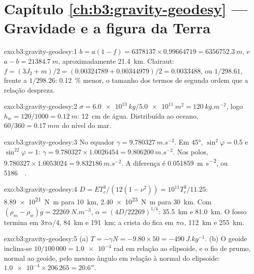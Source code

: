 \section*{Capítulo \ref{ch:b3:gravity-geodesy} --- Gravidade e a figura da Terra}

\begin{solution}{exo:b3:gravity-geodesy:1}
$b = a(1 - f) = 6378137\times0.99664719 = \qty{6356752.3}{m}$, e
$a - b = \qty{21384.7}{m}$, aproximadamente \qty{21.4}{km}. Clairaut:
$f = (3J_2 + m)/2 = (0.00324789 + 0.00344979)/2 = \num{0.0033488}$, ou
$1/298.61$, frente a $1/298.26$: \qty{0.12}{\percent} menor, o tamanho dos
termos de segunda ordem que a relação despreza.
\end{solution}

\begin{solution}{exo:b3:gravity-geodesy:2}
$\sigma = \qty{6.0e13}{kg}/\qty{5.0e11}{m^2} = \qty{120}{kg.m^{-2}}$, logo
$h_w = 120/1000 = \qty{0.12}{m}$: \qty{12}{cm} de água. Distribuída ao
oceano, $60/360 = \qty{0.17}{mm}$ do nível do mar.
\end{solution}

\begin{solution}{exo:b3:gravity-geodesy:3}
No equador $\gamma = \qty{9.780327}{m.s^{-2}}$. Em \ang{45},
$\sin^2\varphi = 0.5$ e $\sin^22\varphi = 1$: $\gamma = 9.780327\times1.0026454
= \qty{9.806200}{m.s^{-2}}$. Nos polos, $9.780327\times1.0053024 =
\qty{9.832186}{m.s^{-2}}$. A diferença é \qty{0.051859}{m.s^{-2}}, ou
\qty{5186}{\milli\gal}.
\end{solution}

\begin{solution}{exo:b3:gravity-geodesy:4}
$D = ET_e^3/(12(1 - \nu^2)) = 10^{11}T_e^3/11.25$: \qty{8.89e21}{N.m} para
\qty{10}{km}, \qty{2.40e23}{N.m} para \qty{30}{km}. Com $(\rho_m - \rho_w)g =
\qty{22269}{N.m^{-3}}$, $\alpha = (4D/22269)^{1/4}$: \qty{35.5}{km} e
\qty{81.0}{km}. O fosso termina em $3\pi\alpha/4$, \qty{84}{km} e \qty{191}{km};
a crista do  fica em $\pi\alpha$, \qty{112}{km} e \qty{255}{km}.
\end{solution}

\begin{solution}{exo:b3:gravity-geodesy:5}
(a) $T = -\gamma N = -9.80\times50 = \qty{-490}{J.kg^{-1}}$. (b) O geoide
inclina-se $10/100\,000 = \num{1.0e-4}$ rad em relação ao elipsoide, e o fio de prumo,
normal ao geoide, pelo mesmo ângulo em relação à normal do elipsoide:
$\num{1.0e-4}\times206\,265 = 20.6''$.
\end{solution}


